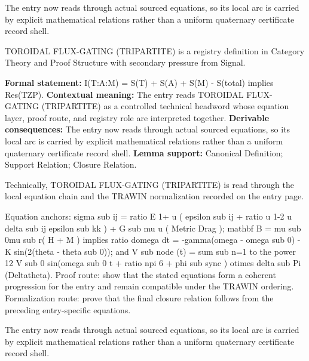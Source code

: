 The entry now reads through actual sourced equations, so its local arc is carried by explicit mathematical relations rather than a uniform quaternary certificate record shell.
\clearpage


\begingroup\small
{}
TOROIDAL FLUX-GATING (TRIPARTITE) is a registry definition in Category Theory and Proof Structure with secondary pressure from Signal.

\begingroup\footnotesize\setlength{\emergencystretch}{3em}\sloppy
\textbf{Formal statement:} I(T:A:M) = S(T) + S(A) + S(M) - S(total) implies Res(TZP). \textbf{Contextual meaning:} The entry reads TOROIDAL FLUX-GATING (TRIPARTITE) as a controlled technical headword whose equation layer, proof route, and registry role are interpreted together. \textbf{Derivable consequences:} The entry now reads through actual sourced equations, so its local arc is carried by explicit mathematical relations rather than a uniform quaternary certificate record shell. \textbf{Lemma support:} Canonical Definition; Support Relation; Closure Relation.\par
\endgroup

Technically, TOROIDAL FLUX-GATING (TRIPARTITE) is read through the local equation chain and the TRAWIN normalization recorded on the entry page.

Equation anchors: sigma sub ij = ratio E 1+ u ( epsilon sub ij + ratio u 1-2 u delta sub ij epsilon sub kk ) + G sub mu u ( Metric Drag ); mathbf B = mu sub 0mu sub r( H + M ) implies ratio domega dt = -gamma(omega - omega sub 0) - K sin(2(theta - theta sub 0)); and V sub node (t) = sum sub n=1 to the power 12 V sub 0 sin(omega sub 0 t + ratio npi 6 + phi sub sync ) otimes delta sub Pi (Deltatheta). Proof route: show that the stated equations form a coherent progression for the entry and remain compatible under the TRAWIN ordering. Formalization route: prove that the final closure relation follows from the preceding entry-specific equations.

The entry now reads through actual sourced equations, so its local arc is carried by explicit mathematical relations rather than a uniform quaternary certificate record shell.
\endgroup

